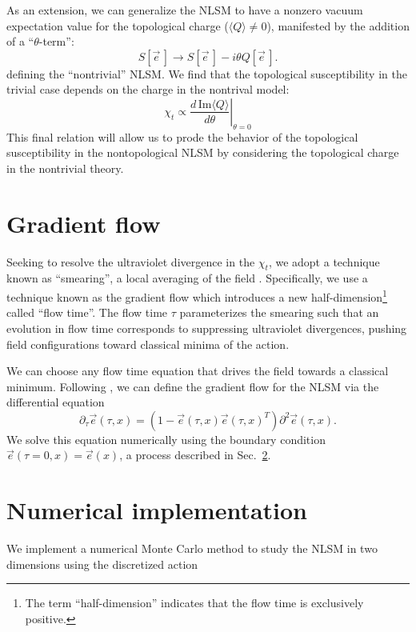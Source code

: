 \documentclass[a4paper,11pt]{article}
\newcommand{\e}{\vec e}
\begin{document}
As an extension, we can generalize the NLSM to have a nonzero vacuum expectation value for the topological charge ($\langle Q \rangle\neq0$), manifested by the addition of a ``$\theta$-term'':
\begin{equation*}
    S[\e\,] \rightarrow S[\e\,] - i \theta Q[\e\,].
\end{equation*}
defining the ``nontrivial'' NLSM. We find that the topological susceptibility in the trivial case depends on the charge in the nontrival model:
\begin{equation}
    \chi_t \propto \left. \frac{d\,\mathrm{Im}\langle Q \rangle}{d\theta}\right|_{\theta=0}
\end{equation}
This final relation will allow us to prode the behavior of the topological susceptibility in the nontopological NLSM by considering the topological charge in the nontrivial theory.










\section{Gradient flow}
\label{sec:gradflow}
Seeking to resolve the ultraviolet divergence in the $\chi_{t}$, we adopt a technique known as ``smearing'', a local averaging of the field \cite{solbrig2008}. Specifically, we use a technique known as the gradient flow \cite{monahan2015} which introduces a new half-dimension\footnote{The term ``half-dimension'' indicates that the flow time is exclusively positive.} called ``flow time''.  The flow time $\tau$ parameterizes the smearing such that an evolution in flow time corresponds to suppressing ultraviolet divergences, pushing field configurations toward classical minima of the action.

We can choose any flow time equation that drives the field towards a classical minimum. Following \cite{bietenholz2018}, we can define the gradient flow for the NLSM via the differential equation
\begin{equation}
    \label{eq:nlsm_gradflow}
  \partial_\tau \e (\tau,x) = \left( 1 - \e(\tau,x) \e(\tau,x)^T \right) \partial^2 \e(\tau,x).
\end{equation}
We solve this equation numerically using the boundary condition $\e(\tau=0,x) = \e(x)$, a process described in Sec.~\ref{sec:numerics}.

\section{Numerical implementation}
\label{sec:numerics}
We implement a numerical Monte Carlo method to study the NLSM in two dimensions using the discretized action
\end{document}
